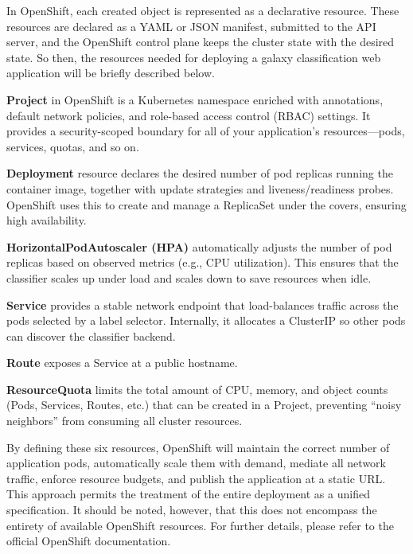 \medskip

In OpenShift, each created object is represented as a declarative resource. These resources are declared as a YAML or JSON manifest, submitted to the API server, and the OpenShift control plane keeps the cluster state with the desired state. So then, the resources needed for deploying a galaxy classification web application will be briefly described below.

\medskip

\textbf{Project} in OpenShift is a Kubernetes namespace enriched with annotations, default network policies, and role-based access control (RBAC) settings. It provides a security-scoped boundary for all of your application’s resources—pods, services, quotas, and so on.

\medskip

\textbf{Deployment} resource declares the desired number of pod replicas running the container image, together with update strategies and liveness/readiness probes. OpenShift uses this to create and manage a ReplicaSet under the covers, ensuring high availability.

\medskip

\textbf{HorizontalPodAutoscaler (HPA)} automatically adjusts the number of pod replicas based on observed metrics (e.g., CPU utilization). This ensures that the classifier scales up under load and scales down to save resources when idle.

\medskip

\textbf{Service} provides a stable network endpoint that load-balances traffic across the pods selected by a label selector. Internally, it allocates a ClusterIP so other pods can discover the classifier backend.

\medskip

\textbf{Route} exposes a Service at a public hostname.

\medskip

\textbf{ResourceQuota} limits the total amount of CPU, memory, and object counts (Pods, Services, Routes, etc.) that can be created in a Project, preventing “noisy neighbors” from consuming all cluster resources.

\medskip

By defining these six resources, OpenShift will maintain the correct number of application pods, automatically scale them with demand, mediate all network traffic, enforce resource budgets, and publish the application at a static URL. This approach permits the treatment of the entire deployment as a unified specification. It should be noted, however, that this does not encompass the entirety of available OpenShift resources. For further details, please refer to the official OpenShift documentation.

